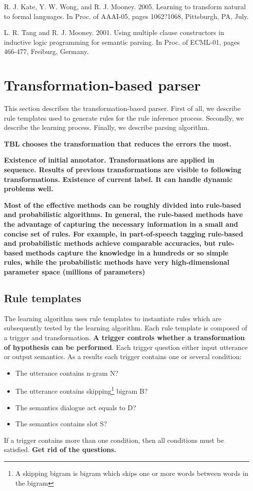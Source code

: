 \documentclass[11pt]{article}
\begin{document}
\cite{kate08} %


R. J. Kate, Y. W. Wong, and R. J. Mooney. 2005. Learning
to transform natural to formal languages. In Proc.
of AAAI-05, pages 1062?1068, Pittsburgh, PA, July. 

L. R. Tang and R. J. Mooney. 2001. Using multiple
clause constructors in inductive logic programming for
semantic parsing. In Proc. of ECML-01, pages 466-477, Freiburg, Germany.


\section{Transformation-based parser}
This section describes the transformation-based parser. First of all, we describe rule templates used to generate rules for the rule inference process. Secondly, we describe the learning process. Finally, we describe parsing algorithm.

\textbf{TBL chooses the transformation that reduces the errors the most.}

\textbf{
Existence of initial annotator.
Transformations are applied in sequence. 
Results of previous transformations are visible to following transformations.
Existence of current label.
It can handle dynamic problems well.
}

\textbf{Most of the effective methods can be roughly divided into rule-based and probabilistic algorithms. In general, the rule-based methods have the advantage of capturing the necessary information in a small and concise set of rules. For example, in part-of-speech tagging rule-based and probabilistic methods achieve comparable accuracies, but rule-based methods capture the knowledge in a hundreds or so simple rules, while the probabilistic methods have very high-dimensional parameter space (millions of parameters)}

\subsection{Rule templates}
The learning algorithm uses rule templates to instantiate rules which are subsequently tested by the learning algorithm. Each rule template is composed of a trigger and transformation. \textbf{A trigger controls whether a transformation of hypothesis can be performed}. Each trigger question either input utterance or output semantics. As a results each trigger contains one or several condition:
\begin{itemize}
  \item The utterance contains n-gram N?
  \item The utterance contains skipping\footnote{A skipping bigram is bigram which skips one or more words between words in the bigram} bigram B?
  \item The semantics dialogue act equals to D?
  \item The semantics contains slot S?
\end{itemize}
If a trigger contains more than one condition, then all conditions must be satisfied. \textbf{Get rid of the questions.}
\end{document}
